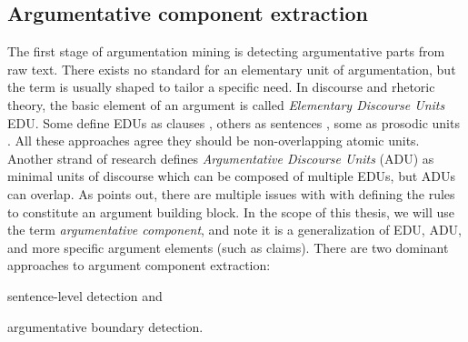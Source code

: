 % 

\subsection{Argumentative component extraction}
\label{subsec:arg_comp_ext}


The first stage of argumentation mining is detecting argumentative parts from
raw text.  There exists no standard for an elementary unit of argumentation,
but the term is usually shaped to tailor a specific need. In discourse and
rhetoric theory, the basic element of an argument is called \textit{Elementary
Discourse Units} EDU. Some define EDUs as clauses \citep{winter1982towards,
givon1983topic}, others as sentences \citep{polanyi1996linguistic}, some as
prosodic units \citep{sacks1978simplest}. All these approaches agree they
should be non-overlapping atomic units. Another strand of research defines
\textit{Argumentative Discourse Units} (ADU) as minimal units of discourse
\citep{peldszus2013argument} which can be composed of multiple EDUs, but ADUs
can overlap.  As \citep{lawrence2019argument} points out, there are multiple
issues with with defining the rules to constitute an argument building block.
In the scope of this thesis, we will use the term \emph{argumentative
component}, and note it is a generalization of EDU, ADU, and more specific
argument elements (such as claims).
There are two dominant approaches to argument component extraction:
\begin{enumerate*}
		\item sentence-level detection and
		\item argumentative boundary detection.
\end{enumerate*}

